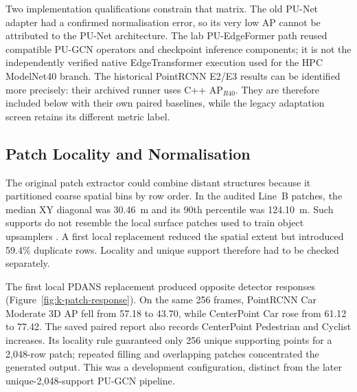 
Two implementation qualifications constrain that matrix. The old PU-Net
adapter had a confirmed normalisation error, so its very low AP cannot
be attributed to the PU-Net architecture. The lab PU-EdgeFormer path
reused compatible PU-GCN operators and checkpoint inference components;
it is not the independently verified native EdgeTransformer execution
used for the HPC ModelNet40 branch. The historical PointRCNN E2/E3
results can be identified more precisely: their archived runner uses
C++ AP$_{R40}$. They are therefore included below with their own paired
baselines, while the legacy adaptation screen retains its different
metric label.



\subsection{Patch Locality and Normalisation}
\label{sec:patch-diagnostics}

The original patch extractor could combine distant structures because
it partitioned coarse spatial bins by row order. In the audited Line~B
patches, the median XY diagonal was 30.46~m and its 90th percentile
was 124.10~m. Such supports do not resemble the local surface patches
used to train object upsamplers \cite{yu2018punet,qian2021pugcn}. A first local replacement reduced the
spatial extent but introduced 59.4\% duplicate rows. Locality and
unique support therefore had to be checked separately.

The first local PDANS replacement produced opposite detector responses
(Figure~\ref{fig:k-patch-response}). On the same 256 frames, PointRCNN
Car Moderate 3D AP fell from 57.18 to 43.70, while CenterPoint Car
rose from 61.12 to 77.42. The saved paired report also records
CenterPoint Pedestrian and Cyclist increases. Its locality rule guaranteed
only 256 unique supporting points for a 2,048-row patch; repeated filling
and overlapping patches concentrated the generated output. This was a
development configuration, distinct from the later unique-2,048-support
PU-GCN pipeline.

